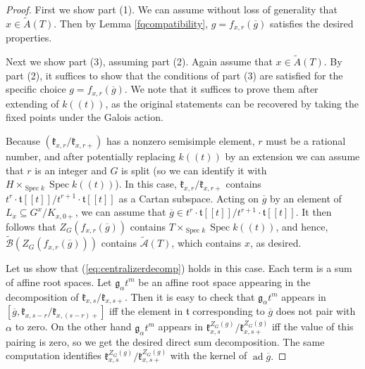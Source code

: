\documentclass[10pt,a4paper]{amsart}
\DeclareMathOperator{\Spec}{Spec}
\newcommand{\on}{\operatorname}
\begin{document}
\begin{proof}
First we show part (1). We can assume without loss of generality that $x\in\widetilde{A}(T).$ Then by Lemma \ref{fqcompatibility}, $g=f_{x,r}(\overline{g})$ satisfies the desired properties.

Next we show part (3), assuming part (2). Again assume that $x\in\widetilde{A}(T).$ By part (2), it suffices to show that the conditions of part (3) are satisfied for the specific choice $g=f_{x,r}(\overline{g})$. We note that it suffices to prove them after extending of $k((t))$, as the original statements can be recovered by taking the fixed points under the Galois action.

Because $(\mathfrak{k}_{x,r}/\mathfrak{k}_{x,r+})$ has a nonzero semisimple element, $r$ must be a rational number, and after potentially replacing $k((t))$ by an extension we can assume that $r$ is an integer and $G$ is split (so we can identify it with $H\times_{\Spec k}\Spec k((t))$). In this case, $\mathfrak{k}_{x,r}/\mathfrak{k}_{x,r+}$ contains $t^r\cdot\mathfrak{t}[[t]]/t^{r+1}\cdot\mathfrak{t}[[t]]$ as a Cartan subspace. Acting on $\overline{g}$ by an element of $L_x\subseteq G^x/K_{x,0+}$, we can assume that $\overline{g}\in t^r\cdot\mathfrak{t}[[t]]/t^{r+1}\cdot\mathfrak{t}[[t]].$ It then follows that $Z_G(f_{x,r}(\overline{g}))$ contains $T\times_{\Spec k}\Spec k((t))$, and hence, $\widetilde{\mathcal{B}}(Z_G(f_{x,r}(\overline{g})))$ contains $\widetilde{\mathcal{A}}(T)$, which contains $x$, as desired.

Let us show that (\ref{eq:centralizerdecomp}) holds in this case. Each term is a sum of affine root spaces. Let $\mathfrak{g}_{\alpha}t^m$ be an affine root space appearing in the decomposition of $\mathfrak{k}_{x,s}/\mathfrak{k}_{x,s+}$. Then it is easy to check that $\mathfrak{g}_{\alpha}t^m$ appears in $[\overline{g},\mathfrak{k}_{x,s-r}/\mathfrak{k}_{x,(s-r)+}]$ iff the element in $\mathfrak{t}$ corresponding to $\overline{g}$ does not pair with $\alpha$ to zero. On the other hand $\mathfrak{g}_{\alpha}t^m$ appears in $\mathfrak{k}^{Z_G(g)}_{x,s}/\mathfrak{k}^{Z_G(g)}_{x,s+}$ iff the value of this pairing is zero, so we get the desired direct sum decomposition. The same computation identifies $\mathfrak{k}^{Z_G(g)}_{x,s}/\mathfrak{k}^{Z_G(g)}_{x,s+}$ with the kernel of $\on{ad}\overline{g}.$


\end{proof}
\end{document}
